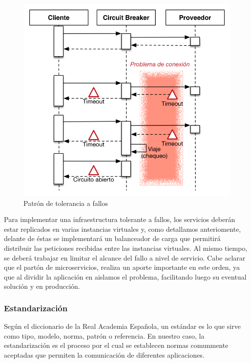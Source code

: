 \begin{figure}[H]
  \includegraphics[width=\linewidth]{src/images/04-capitulo-4/circuit-breaker.png}
  \caption{Patrón de tolerancia a fallos }
  \label{fig:circuit_breaker}
\end{figure}

Para implementar una infraestructura tolerante a fallos, los servicios deberán estar replicados en varias instancias virtuales y, como detallamos anteriomente, delante de éstas se implementará un balanceador de carga que permitirá distribuir las peticiones recibidas entre las instancias virtuales.  Al mismo tiempo, se deberá trabajar en limitar el alcance del fallo a nivel de servicio.  Cabe aclarar que el partón de microservicios, realiza un aporte importante en este orden, ya que al dividir la aplicación en  aislamos el problema, facilitando luego su eventual solución y  en producción.

\subsubsection{Estandarización}

Según el diccionario de la Real Academia Española, un estándar es lo que sirve como tipo, modelo, norma, patrón o referencia. En nuestro caso, la estandarización es el proceso por el cual se establecen normas comunmente aceptadas que permiten la comunicación de diferentes aplicaciones.

